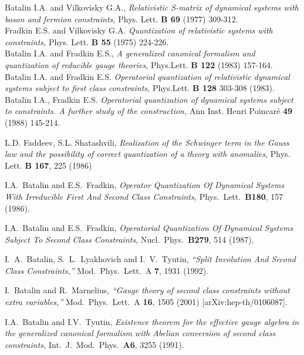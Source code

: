 \documentclass[a4paper,12pt]{amsart}
\numberwithin{equation}{section}
\begin{document}
\begin{thebibliography}{33}

         Batalin I.A. and  Vilkovisky G.A.,
         {\em Relativistic S-matrix of dynamical systems with boson
         and fermion constraints,}
         Phys. Lett. {\bf B 69} (1977) 309-312.          \\
         Fradkin E.S. and Vilkovisky G.A. {\em Quantization
         of relativistic systems with
         constraints,}  Phys. Lett. {\bf B 55} (1975) 224-226.  \\
         Batalin I.A. and Fradkin E.S.,
         {\em  A generalized canonical formalism and quantization of
         reducible gauge theories,}
           Phys.Lett. {\bf B 122 }     (1983) 157-164.   \\
         Batalin I.A. and Fradkin E.S.
         {\em Operatorial quantization of relativistic dynamical systems
         subject to first class constraints,}
         Phys.Lett. {\bf B 128} 303-308 (1983).             \\
         Batalin I.A., Fradkin E.S.
         {\em Operatorial quantization of dynamical systems subject to
         constraints. A further study of the construction,}
         Ann Inst. Henri Poincar\'e  {\bf 49} (1988) 145-214.


 L.D. Faddeev, S.L. Shatashvili, {\em Realization of the
Schwinger term in the Gauss law and the possibility of
correct quantization of a theory with anomalies},
 Phys. Lett. {\bf B 167}, 225 (1986)

 I.A.~Batalin and E.S.~Fradkin,
{\em Operator Quantization Of Dynamical Systems With Irreducible
First And Second Class Constraints,} Phys.\ Lett.\ {\bf B180}, 157 (1986).

 I.A.~Batalin and E.S.~Fradkin, {\em
Operatorial Quantization Of Dynamical Systems Subject To Second Class
Constraints,} Nucl.\ Phys.\ {\bf B279}, 514 (1987).




I.~A.~Batalin, S.~L.~Lyakhovich and I.~V.~Tyutin,
{\em ``Split Involution And Second Class Constraints,''}
Mod.\ Phys.\ Lett.\ A {\bf 7}, 1931 (1992).

I.~Batalin and R.~Marnelius,
{\em ``Gauge theory of second class constraints without extra variables,''}
Mod.\ Phys.\ Lett.\ A {\bf 16}, 1505 (2001)
[arXiv:hep-th/0106087].


 I.A.~Batalin and I.V.~Tyutin, {\em
Existence theorem for the effective gauge algebra in the generalized
        canonical formalism with Abelian conversion of second class
        constraints,} Int.\ J.\ Mod.\ Phys.\ {\bf A6}, 3255 (1991).



\end{thebibliography}
\end{document}

